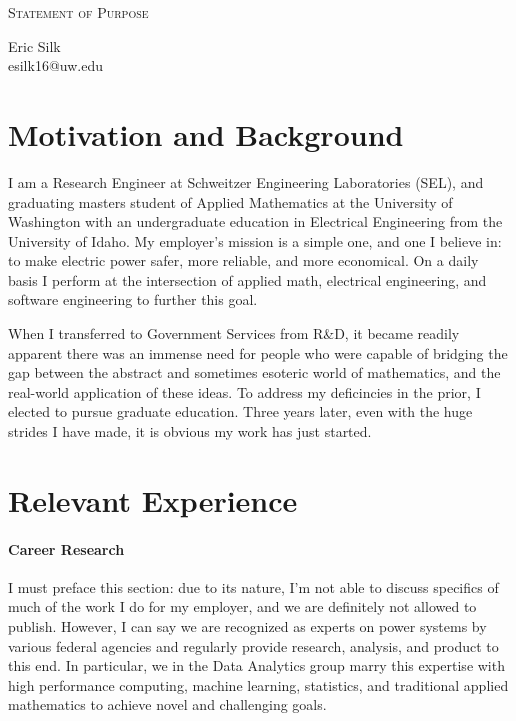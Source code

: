 \documentclass[letterpaper]{article}
\makeatletter
\newcommand{\soptitle}{Statement of Purpose}
\newcommand{\yourname}{Eric Silk}
\newcommand{\youremail}{esilk16@uw.edu}
\makeatother
\begin{document}
\begin{center}{\huge \scshape \soptitle}\end{center}
\begin{center}\vspace{0.2em} {\Large \yourname\\}
  {\youremail}\end{center}

\section*{Motivation and Background}
I am a Research Engineer at Schweitzer Engineering Laboratories (SEL), and graduating masters
student of Applied Mathematics at the University of Washington with an undergraduate
education in Electrical Engineering from the University of Idaho. My employer's mission is
a simple one, and one I believe in: to make electric power safer, more reliable, and
more economical. On a daily basis I perform at the intersection of applied math, electrical
engineering, and software engineering to further this goal.

When I transferred to Government Services from R\&D, it became readily apparent there was
an immense need for people who were capable of bridging the gap between the abstract and
sometimes esoteric world of mathematics, and the real-world application of these ideas.
To address my deficincies in the prior, I elected to pursue graduate education. 
Three years later, even with the huge strides I have made, it is obvious my work has
just started.

\section*{Relevant Experience}
\paragraph{Career Research}
I must preface this section: due to its nature, I'm not able to discuss specifics of
much of the work I do for my employer, and we are definitely not allowed to publish.
However, I can say we are recognized as experts
on power systems by various federal agencies and regularly provide research, analysis,
and product to this end. In particular, we in the Data Analytics group marry this expertise
with high performance computing, machine learning, statistics, and traditional applied
mathematics to achieve novel and challenging goals.
\end{document}
